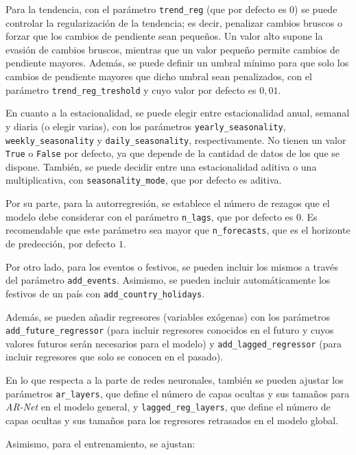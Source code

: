 \documentclass[12pt,twoside]{article}
\begin{document}
Para la tendencia, con el parámetro \texttt{trend\_reg} (que por defecto es $0$) se puede controlar la regularización de la tendencia; es decir, penalizar cambios bruscos o forzar que los cambios de pendiente sean pequeños. Un valor alto supone la evasión de cambios bruscos, mientras que un valor pequeño permite cambios de pendiente mayores. Además, se puede definir un umbral mínimo para que solo los cambios de pendiente mayores que dicho umbral sean penalizados, con el parámetro \texttt{trend\_reg\_treshold} y cuyo valor por defecto es $0,01$.

En cuanto a la estacionalidad, se puede elegir entre estacionalidad anual, semanal y diaria (o elegir varias), con los parámetros \texttt{yearly\_seasonality}, \texttt{weekly\_seasonality} y \texttt{daily\_seasonality}, respectivamente. No tienen un valor \texttt{True} o \texttt{False} por defecto, ya que depende de la cantidad de datos de los que se dispone. También, se puede decidir entre una estacionalidad aditiva o una multiplicativa, con \texttt{seasonality\_mode}, que por defecto es aditiva.

Por su parte, para la autorregresión, se establece el número de rezagos que el modelo debe considerar con el parámetro \texttt{n\_lags}, que por defecto es $0$. Es recomendable que este parámetro sea mayor que \texttt{n\_forecasts}, que es el horizonte de predección, por defecto $1$.

Por otro lado, para los eventos o festivos, se pueden incluir los mismos a través del parámetro \texttt{add\_events}. Asimismo, se pueden incluir automáticamente los festivos de un país con \texttt{add\_country\_holidays}.

Además, se pueden añadir regresores (variables exógenas) con los parámetros 
\newline
\texttt{add\_future\_regressor} (para incluir regresores conocidos en el futuro y cuyos valores futuros serán necesarios para el modelo) y \texttt{add\_lagged\_regressor} (para incluir regresores que solo se conocen en el pasado).

En lo que respecta a la parte de redes neuronales, también se pueden ajustar los parámetros \texttt{ar\_layers}, que define el número de capas ocultas y sus tamaños para \textit{AR-Net} en el modelo general, y \texttt{lagged\_reg\_layers}, que define el número de capas ocultas y sus tamaños para los regresores retrasados en el modelo global.


Asimismo, para el entrenamiento, se ajustan:
\end{document}
